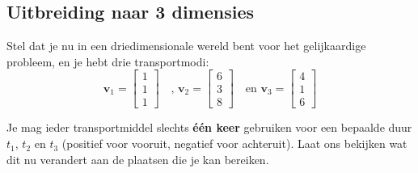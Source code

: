 \documentclass{ximera}
\begin{document}
\subsection*{Uitbreiding naar 3 dimensies}
Stel dat je nu in een driedimensionale wereld bent voor het gelijkaardige probleem, en je hebt drie transportmodi:
\[\mathbf{v}_1 = \begin{bmatrix} 1 \\ 1 \\ 1 \end{bmatrix}\quad \text{, }\mathbf{v}_2 = \begin{bmatrix} 6 \\ 3 \\ 8 \end{bmatrix}\quad \text{en }\mathbf{v}_3 = \begin{bmatrix} 4 \\ 1 \\ 6 \end{bmatrix}\]

Je mag ieder transportmiddel slechts \textbf{één keer} gebruiken voor een bepaalde duur \(t_1\), \(t_2\) en \(t_3\) (positief voor vooruit, negatief voor achteruit).
Laat ons bekijken wat dit nu verandert aan de plaatsen die je kan bereiken.
\end{document}
